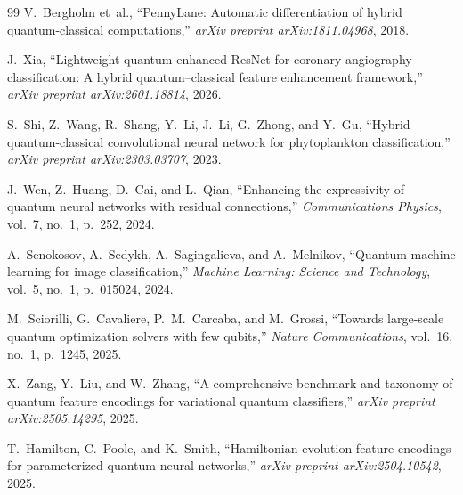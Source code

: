 \documentclass[10pt,twocolumn,twoside,a4paper]{article}
\begin{document}
\begin{thebibliography}{99}
V.~Bergholm et~al.,
``PennyLane: Automatic differentiation of hybrid quantum-classical computations,''
\textit{arXiv preprint arXiv:1811.04968}, 2018.

J.~Xia,
``Lightweight quantum-enhanced ResNet for coronary angiography classification: A hybrid quantum--classical feature enhancement framework,''
\textit{arXiv preprint arXiv:2601.18814}, 2026.

S.~Shi, Z.~Wang, R.~Shang, Y.~Li, J.~Li, G.~Zhong, and Y.~Gu,
``Hybrid quantum-classical convolutional neural network for phytoplankton classification,''
\textit{arXiv preprint arXiv:2303.03707}, 2023.

J.~Wen, Z.~Huang, D.~Cai, and L.~Qian,
``Enhancing the expressivity of quantum neural networks with residual connections,''
\textit{Communications Physics}, vol.~7, no.~1, p.~252, 2024.

A.~Senokosov, A.~Sedykh, A.~Sagingalieva, and A.~Melnikov,
``Quantum machine learning for image classification,''
\textit{Machine Learning: Science and Technology}, vol.~5, no.~1, p.~015024, 2024.

M.~Sciorilli, G.~Cavaliere, P.~M.~Carcaba, and M.~Grossi,
``Towards large-scale quantum optimization solvers with few qubits,''
\textit{Nature Communications}, vol.~16, no.~1, p.~1245, 2025.

X.~Zang, Y.~Liu, and W.~Zhang,
``A comprehensive benchmark and taxonomy of quantum feature encodings for variational quantum classifiers,''
\textit{arXiv preprint arXiv:2505.14295}, 2025.

T.~Hamilton, C.~Poole, and K.~Smith,
``Hamiltonian evolution feature encodings for parameterized quantum neural networks,''
\textit{arXiv preprint arXiv:2504.10542}, 2025.

\end{thebibliography}
\end{document}
